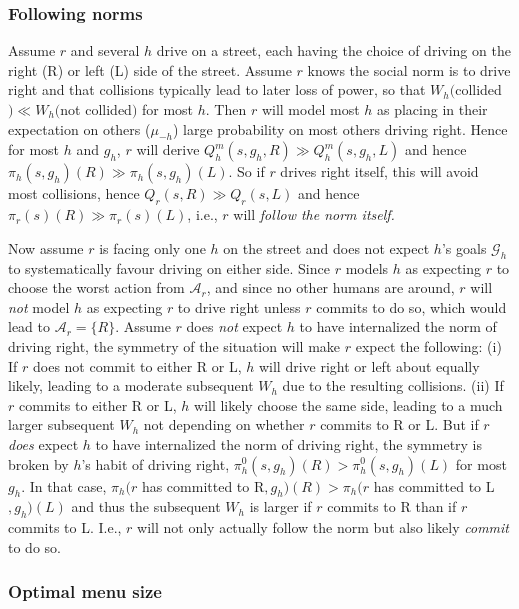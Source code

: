 \documentclass[letterpaper]{article} %
\def\A{\mathcal{A}}
\def\G{\mathcal{G}}
\begin{document}
\subsubsection*{Following norms}

Assume $r$ and several $h$ drive on a street, each having the choice of driving on the right (R) or left (L) side of the street. 
Assume $r$ knows the social norm is to drive right and that collisions typically lead to later loss of power, so that $W_h($collided$)\ll W_h($not collided$)$ for most $h$.
Then $r$ will model most $h$ as placing in their expectation on others ($\mu_{-h}$) large probability on most others driving right.
Hence for most $h$ and $g_h$, $r$ will derive $Q^m_h(s,g_h,R)\gg Q^m_h(s,g_h,L)$ and hence $\pi_h(s,g_h)(R)\gg \pi_h(s,g_h)(L)$.
So if $r$ drives right itself, this will avoid most collisions, hence $Q_r(s,R)\gg Q_r(s,L)$ and hence $\pi_r(s)(R)\gg \pi_r(s)(L)$, i.e., $r$ will {\em follow the norm itself.}

Now assume $r$ is facing only one $h$ on the street and does not expect $h$'s goals $\G_h$ to systematically favour driving on either side.
Since $r$ models $h$ as expecting $r$ to choose the worst action from $\A_r$, and since no other humans are around, $r$ will {\em not} model $h$ as expecting $r$ to drive right unless $r$ commits to do so, which would lead to $\A_r=\{R\}$. 
Assume $r$ does {\em not} expect $h$ to have internalized the norm of driving right, the symmetry of the situation will make $r$ expect the following: 
(i) If $r$ does not commit to either R or L, $h$ will drive right or left about equally likely, leading to a moderate subsequent $W_h$ due to the resulting collisions.
(ii) If $r$ commits to either R or L, $h$ will likely choose the same side, leading to a much larger subsequent $W_h$ not depending on whether $r$ commits to R or L.
But if $r$ {\em does} expect $h$ to have internalized the norm of driving right, the symmetry is broken by $h$'s habit of driving right, $\pi^0_h(s,g_h)(R)>\pi^0_h(s,g_h)(L)$ for most $g_h$. 
In that case, $\pi_h(r$ has committed to R$,g_h)(R)>\pi_h(r$ has committed to L$,g_h)(L)$ and thus the subsequent $W_h$ is larger if $r$ commits to R than if $r$ commits to L.
I.e., $r$ will not only actually follow the norm but also likely {\em commit} to do so.

\subsubsection*{Optimal menu size}
\end{document}
